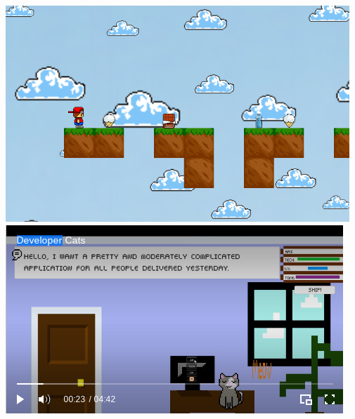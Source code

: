 \documentclass[../r.tex]{subfiles}
\begin{document}
\noindent
\href{https://github.com/randompast/Vitaman-Game}{\includegraphics[scale=0.37]{../fun/vitamangame.png}}
\href{./fun/devcats.mp4}{\includegraphics[scale=0.425]{../fun/devcats.png}}
\end{document}
